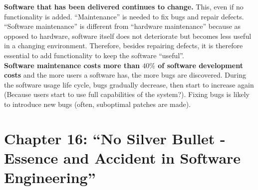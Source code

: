 \documentclass[a4paper,11pt]{report}
\begin{document}
\textbf{Software that has been delivered continues to change.} This, even if no
functionality is added. ``Maintenance'' is needed to fix bugs and repair
defects. ``Software maintenance'' is different from ``hardware maintenance''
because as opposed to hardware, software itself does not deteriorate but becomes
less useful in a changing environment. Therefore, besides repairing defects, it
is therefore essential to add functionality to keep the software ``useful''.\\

\textbf{Software maintenance costs more than $40\%$ of software development
costs} and the more users a software has, the more bugs are discovered. During
the software usage life cycle, bugs gradually decrease, then start to increase
again (Because users start to use full capabilities of the system?). Fixing bugs
is likely to introduce new bugs (often, suboptimal patches are made).


\section{Chapter 16: ``No Silver Bullet - Essence and Accident in Software Engineering''}
\end{document}
